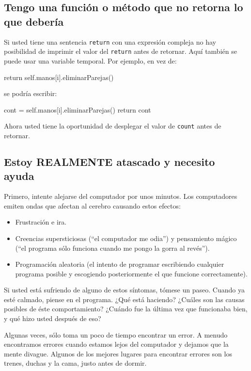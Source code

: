 \subsection{Tengo una función o método que no retorna lo que debería}

 

Si usted tiene una sentencia \texttt{return} con una expresión compleja
no hay posibilidad de imprimir el valor del \texttt{return} antes
de retornar. Aquí también se puede usar una variable temporal. Por
ejemplo, en vez de:

\begin{pythoncode}
return self.manos[i].eliminarParejas()
\end{pythoncode}
 se podría escribir:

\begin{pythoncode}
cont = self.manos[i].eliminarParejas()
return cont
\end{pythoncode}
 Ahora usted tiene la oportunidad de desplegar el valor de \texttt{count}
antes de retornar.

\subsection{Estoy REALMENTE atascado y necesito ayuda}

Primero, intente alejarse del computador por unos minutos. Los computadores
emiten ondas que afectan al cerebro causando estos efectos:
\begin{itemize}
\item Frustración e ira.
\item Creencias supersticiosas (``el computador me odia'') y pensamiento
mágico (``el programa sólo funciona cuando me pongo la gorra al revés'').
\item Programación aleatoria (el intento de programar escribiendo cualquier
programa posible y escogiendo posteriormente el que funcione correctamente).
\end{itemize}
Si usted está sufriendo de alguno de estos síntomas, tómese un paseo.
Cuando ya esté calmado, piense en el programa. ¿Qué está haciendo?
¿Cuáles son las causas posibles de éste comportamiento? ¿Cuándo fue
la última vez que funcionaba bien, y qué hizo usted después de eso?

Algunas veces, sólo toma un poco de tiempo encontrar un error. A menudo
encontramos errores cuando estamos lejos del computador y dejamos
que la mente divague. Algunos de los mejores lugares para encontrar
errores son los trenes, duchas y la cama, justo antes de dormir.

